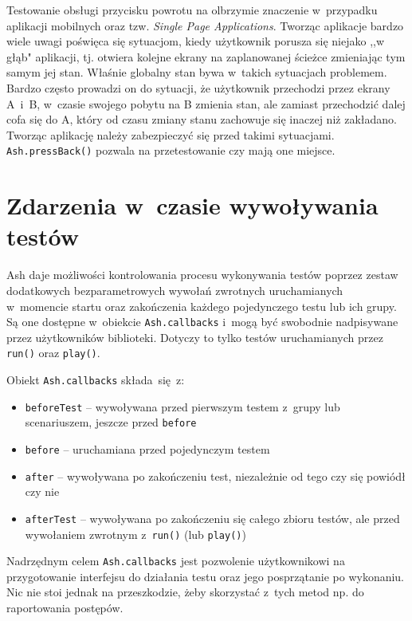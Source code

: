 \documentclass{xmgr}
\begin{document}
Testowanie obsługi przycisku powrotu na olbrzymie znaczenie w~przypadku aplikacji mobilnych oraz tzw. \textit{Single Page Applications}. Tworząc aplikacje bardzo wiele uwagi poświęca się sytuacjom, kiedy użytkownik porusza się niejako ,,w głąb" aplikacji, tj. otwiera kolejne ekrany na zaplanowanej ścieżce zmieniając tym samym jej stan.  Właśnie globalny stan bywa w~takich sytuacjach problemem. Bardzo często prowadzi on do sytuacji, że użytkownik przechodzi przez ekrany A~i~B, w~czasie swojego pobytu na B zmienia stan, ale zamiast przechodzić dalej cofa się do A, który od czasu zmiany stanu zachowuje się inaczej niż zakładano. Tworząc aplikację należy zabezpieczyć się przed takimi sytuacjami. \texttt{Ash.pressBack()} pozwala na przetestowanie czy mają one miejsce. 

\section{Zdarzenia w~czasie wywoływania testów}

Ash daje możliwości kontrolowania procesu wykonywania testów poprzez zestaw dodatkowych bezparametrowych wywołań zwrotnych uruchamianych w~momencie startu oraz zakończenia każdego pojedynczego testu lub ich grupy. Są one dostępne w~obiekcie \texttt{Ash.callbacks} i~mogą być swobodnie nadpisywane przez użytkowników biblioteki. Dotyczy to tylko testów uruchamianych przez \texttt{run()} oraz \texttt{play()}.

Obiekt \texttt{Ash.callbacks} składa~się~z:

\begin{itemize}
  \item \texttt{beforeTest} -- wywoływana przed pierwszym testem z~grupy lub scenariuszem, jeszcze przed \texttt{before}
  \item \texttt{before} -- uruchamiana przed pojedynczym testem
  \item \texttt{after} -- wywoływana po zakończeniu test, niezależnie od tego czy się powiódł czy nie
  \item \texttt{afterTest} -- wywoływana po zakończeniu się całego zbioru testów, ale przed wywołaniem zwrotnym z~\texttt{run()} (lub \texttt{play()}) 
\end{itemize}

Nadrzędnym celem \texttt{Ash.callbacks} jest pozwolenie użytkownikowi na przygotowanie interfejsu do działania testu oraz jego posprzątanie po wykonaniu. Nic nie stoi jednak na przeszkodzie, żeby skorzystać z~tych metod np. do raportowania postępów.
\end{document}
